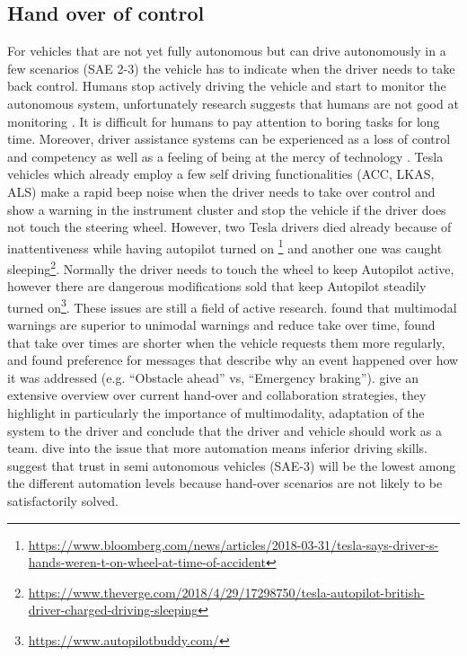 \subsection{Hand over of control}
For vehicles that are not yet fully autonomous but can drive autonomously in a few scenarios (SAE 2-3) the vehicle has to indicate when the driver needs to take back control. Humans stop actively driving the vehicle and start to monitor the autonomous system, unfortunately research suggests that humans are not good at monitoring \cite{Naujoks2014TheConditions.}. It is difficult for humans to pay attention to boring tasks for long time. Moreover, driver assistance systems can be experienced as a loss of control and competency as well as a feeling of being at the mercy of technology \cite{Eckoldt2012AnSystems}. Tesla vehicles which already employ a few self driving functionalities (ACC, LKAS, ALS) make a rapid beep noise when the driver needs to take over control and show a warning in the instrument cluster and stop the vehicle if the driver does not touch the steering wheel. However, two Tesla drivers died already because of inattentiveness while having autopilot turned on \footnote{\url{https://www.bloomberg.com/news/articles/2018-03-31/tesla-says-driver-s-hands-weren-t-on-wheel-at-time-of-accident}} and another one was caught sleeping\footnote{\url{https://www.theverge.com/2018/4/29/17298750/tesla-autopilot-british-driver-charged-driving-sleeping}}. Normally the driver needs to touch the wheel to keep Autopilot active, however there are dangerous modifications sold that keep Autopilot steadily turned on\footnote{\url{https://www.autopilotbuddy.com/}}. These issues are still a field of active research. \cite{Politis} found that multimodal warnings are superior to unimodal warnings and reduce take over time, \cite{Merat2014TransitionVehicle} found that take over times are shorter when the vehicle requests them more regularly, and \cite{Koo2015} found preference for messages that describe why an event happened over how it was addressed (e.g. “Obstacle ahead” vs, “Emergency braking”).  \cite{Walch2017} give an extensive overview over current hand-over and collaboration strategies, they highlight in particularly the importance of multimodality, adaptation of the system to the driver and conclude that the driver and vehicle should work as a team. \cite{Meschtscherjakova} dive into the issue that more automation means inferior driving skills. \cite{Rodel} suggest that trust in semi autonomous vehicles (SAE-3) will be the lowest among the different automation levels because hand-over scenarios are not likely to be satisfactorily solved. 



